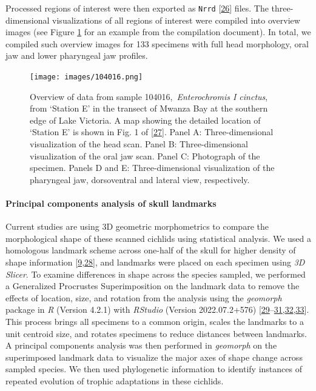 Processed regions of interest were then exported as \texttt{Nrrd} {[}\protect\hyperlink{ref-rn6XbmFW}{26}{]} files.
The three-dimensional visualizations of all regions of interest were compiled into overview images (see Figure \ref{fig:104016} for an example from the compilation document).
In total, we compiled such overview images for 133 specimens with full head morphology, oral jaw and lower pharyngeal jaw profiles.

\begin{figure}
\hypertarget{fig:104016}{%
\centering
\texttt{[image: images/104016.png]}
\caption{Overview of data from sample 104016,~\emph{Enterochromis I cinctus}, from `Station E' in the transect of Mwanza Bay at the southern edge of Lake Victoria.
A map showing the detailed location of `Station E' is shown in Fig. 1 of {[}\protect\hyperlink{ref-JtHcU2O2}{27}{]}.
Panel A: Three-dimensional visualization of the head scan.
Panel B: Three-dimensional visualization of the oral jaw scan.
Panel C: Photograph of the specimen.
Panels D and E: Three-dimensional visualization of the pharyngeal jaw, dorsoventral and lateral view, respectively.}\label{fig:104016}
}
\end{figure}

\hypertarget{principal-components-analysis-of-skull-landmarks}{%
\paragraph{Principal components analysis of skull landmarks}\label{principal-components-analysis-of-skull-landmarks}}

Current studies are using 3D geometric morphometrics to compare the morphological shape of these scanned cichlids using statistical analysis.
We used a homologous landmark scheme across one-half of the skull for higher density of shape information {[}\protect\hyperlink{ref-BDrCSu8p}{9},\protect\hyperlink{ref-15FafMZm5}{28}{]}, and landmarks were placed on each specimen using \emph{3D Slicer}.
To examine differences in shape across the species sampled, we performed a Generalized Procrustes Superimposition on the landmark data to remove the effects of location, size, and rotation from the analysis using the \emph{geomorph} package in \emph{R} (Version 4.2.1) with \emph{RStudio} (Version 2022.07.2+576) {[}\protect\hyperlink{ref-VPUOQA2P}{29}--\protect\hyperlink{ref-EwNL0C0Y}{31},\protect\hyperlink{ref-whEyWyQh}{32},\protect\hyperlink{ref-QfVloFVu}{33}{]}.
This process brings all specimens to a common origin, scales the landmarks to a unit centroid size, and rotates specimens to reduce distances between landmarks.
A principal components analysis was then performed in \emph{geomorph} on the superimposed landmark data to visualize the major axes of shape change across sampled species.
We then used phylogenetic information to identify instances of repeated evolution of trophic adaptations in these cichlids.

